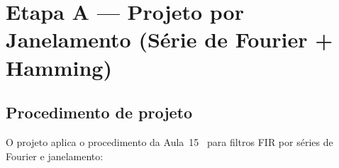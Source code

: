 \documentclass[11pt,a4paper]{article}
\begin{document}
\FloatBarrier
\section{Etapa A — Projeto por Janelamento (Série de Fourier + Hamming)}
\label{sec:etapaA}

\subsection{Procedimento de projeto}

O projeto aplica o procedimento da Aula~15~\cite{aula15} para filtros FIR por séries de Fourier e janelamento:
\end{document}
